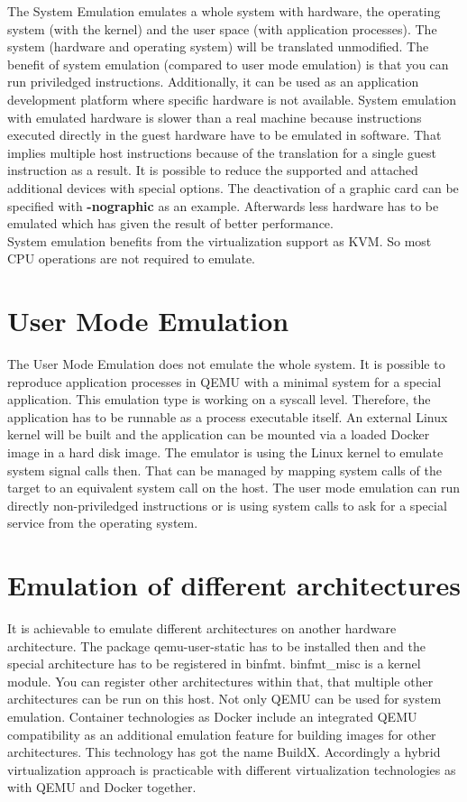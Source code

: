 The System Emulation emulates a whole system with hardware, the operating system (with the kernel) and the user space (with application processes). 
The system (hardware and operating system) will be translated unmodified. The benefit of system emulation (compared to user mode emulation) is that you can run priviledged instructions\cite{Butt2011}. 
Additionally, it can be used as an application development platform where specific hardware is not available. 
System emulation with emulated hardware is slower than a real machine because instructions executed directly in the guest hardware have to be emulated in software. 
That implies multiple host instructions because of the translation for a single guest instruction as a result\cite[~p.1]{Tong2014}.
It is possible to reduce the supported and attached additional devices with special options. The deactivation of a graphic card can be specified with \textbf{-nographic} as an example. Afterwards less hardware has to be emulated which has given the result of better performance. \\
System emulation benefits from the virtualization support as KVM. So most CPU operations are not required to emulate.

\section{User Mode Emulation}

The User Mode Emulation does not emulate the whole system. It is possible to reproduce application processes in QEMU with a minimal system for a special application. 
This emulation type is working on a syscall level. Therefore, the application has to be runnable as a process executable itself. 
An external Linux kernel will be built and the application can be mounted via a loaded Docker image in a hard disk image. The emulator is using the Linux kernel to emulate system signal calls then. That can be managed by mapping system calls of the target to an equivalent system call on the host.
The user mode emulation can run directly non-priviledged instructions or is using system calls to ask for a special service from the operating system\cite{Butt2011}.


\section{Emulation of different architectures}

It is achievable to emulate different architectures on another hardware architecture. The package qemu-user-static has to be installed then and the special architecture has to be registered in binfmt. binfmt\_misc is a kernel module. 
You can register other architectures within that, that multiple other architectures can be run on this host. 
Not only QEMU can be used for system emulation. Container technologies as Docker include an integrated QEMU compatibility as an additional emulation feature for building images for other architectures. 
This technology has got the name BuildX. Accordingly a hybrid virtualization approach is practicable with different virtualization technologies as with QEMU and Docker together.


